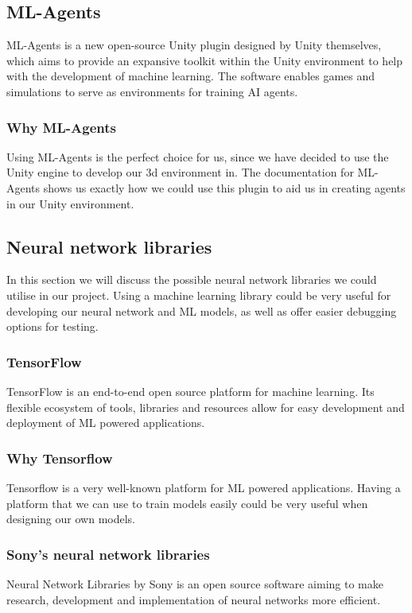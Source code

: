 \subsection{ML-Agents}
ML-Agents is a new open-source Unity plugin designed by Unity themselves, which aims to provide an expansive toolkit within the Unity environment to help with the development of machine learning. The software enables games and simulations to serve as environments for training AI agents. 

\subsubsection{Why ML-Agents}
Using ML-Agents is the perfect choice for us, since we have decided to use the Unity engine to develop our 3d environment in. The documentation for ML-Agents shows us exactly how we could use this plugin to aid us in creating agents in our Unity environment.

\subsection{Neural network libraries}
In this section we will discuss the possible neural network libraries we could utilise in our project. Using a machine learning library could be very useful for developing our neural network and ML models, as well as offer easier debugging options for testing.

\subsubsection{TensorFlow}
TensorFlow is an end-to-end open source platform for machine learning. Its flexible ecosystem of tools, libraries and resources allow for easy development and deployment of ML powered applications.
\subsubsection{Why Tensorflow}
Tensorflow is a very well-known platform for ML powered applications. Having a platform that we can use to train models easily could be very useful when designing our own models.

\subsubsection{Sony’s neural network libraries}
Neural Network Libraries by Sony is an open source software aiming to make research, development and implementation of neural networks more efficient.

